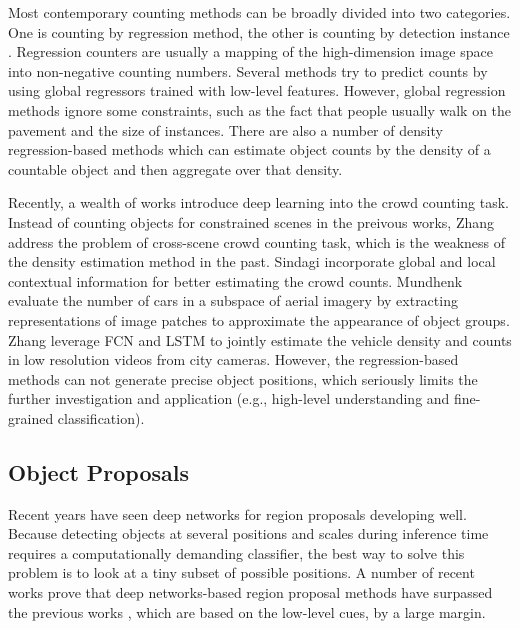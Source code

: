 \documentclass[10pt,twocolumn,letterpaper]{article}
\begin{document}
Most contemporary counting methods can be broadly divided into two categories. One is counting by regression method, the other is counting by detection instance \cite{38_moranduzzo2014automatic, 49_kamenetsky2015aerial}. Regression counters are usually a mapping of the high-dimension image space into non-negative counting numbers. Several methods \cite{44_an2007face, 45_chan2008privacy, 46_chen2013cumulative, 47_chen2012feature, 48_kong2006viewpoint} try to predict counts by using global regressors trained with low-level features. However, global regression methods ignore some constraints, such as the fact that people usually walk on the pavement and the size of instances. There are also a number of density regression-based methods \cite{51_rodriguez2011density, 52_lempitsky2010learning, 54_arteta2014interactive} which can estimate object counts by the density of a countable object and then aggregate over that density.

Recently, a wealth of works introduce deep learning into the crowd counting task. Instead of counting objects for constrained scenes in the preivous works, Zhang \etal \cite{53_zhang2015cross} address the problem of cross-scene crowd counting task, which is the weakness of the density estimation method in the past. Sindagi \etal \cite{55_sindagi2017generating} incorporate global and local contextual information for better estimating the crowd counts. Mundhenk \etal \cite{04_mundhenk2016large} evaluate the number of cars in a subspace of aerial imagery by extracting representations of image patches to approximate the appearance of object groups. 
Zhang \etal \cite{57_zhang2017fcn} leverage FCN and LSTM to jointly estimate the vehicle density and counts in low resolution videos from city cameras. However, the regression-based methods can not generate precise object positions, which seriously limits the further investigation and application (e.g., high-level understanding and fine-grained classification).

\subsection{Object Proposals}

Recent years have seen deep networks for region proposals developing well. Because detecting objects at several positions and scales during inference time requires a computationally demanding classifier, the best way to solve this problem is to look at a tiny subset of possible positions. A number of recent works prove that deep networks-based region proposal methods have surpassed the previous works \cite{17_uijlings2013selective, 28_arbelaez2014multiscale, 29_zitnick2014edge, 30_cheng2014bing}, which are based on the low-level cues, by a large margin.
\end{document}
